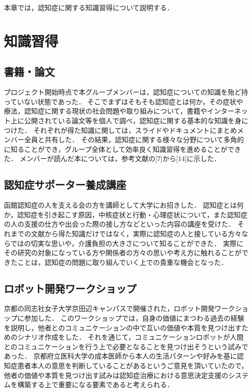 \documentclass[../report]{subfiles}
\begin{document}
本章では，認知症に関する知識習得について説明する．


\section{知識習得}
\subsection{書籍・論文}
プロジェクト開始時点で本グループメンバーは，認知症についての知識を殆ど持っていない状態であった．
そこでまずはそもそも認知症とは何か，その症状や療法，認知症に関する現状の社会問題や取り組みについて，書籍やインターネット上に公開されている論文等を個人で調べ，認知症に関する基本的な知識を身につけた．
それぞれが得た知識に関しては，スライドやドキュメントにまとめメンバー全員と共有した．
その結果，認知症に関する様々な分野について多角的に知ることができ，グループ全体として効率良く知識習得を進めることができた．
メンバーが読んだ本については，参考文献の[7]から[14]に示した．

\subsection{認知症サポーター養成講座}
函館認知症の人を支える会の方を講師として大学にお招きした．
認知症とは何か，認知症を引き起こす原因，中核症状と行動・心理症状について，また認知症の人の支援の仕方や出会った際の接し方などといった内容の講座を受けた．
それまでの文献から得た知識だけではなく，実際に認知症の人と接している方々ならではの切実な思いや，介護負担の大きさについて知ることができた．
実際にその研究の対象になっている方や関係者の方々の思いや考え方に触れることができたことは，認知症の問題に取り組んでいく上での貴重な機会となった．

\subsection{ロボット開発ワークショップ}
京都の同志社女子大学京田辺キャンパスで開催された，ロボット開発ワークショップに参加した．
このワークショップでは，自身の価値にまつわる過去の経験を説明し，他者とのコミュニケーションの中で互いの価値や本質を見つけ出すためのシナリオ作成をした．
それを通じて，コミュニケーションロボットが人間とのコミュニケーションを行う上で必要となることを見つけ出そうという試みであった．
京都府立医科大学の成本医師から本人の生活パターンや好みを基に認知症患者本人の意思を判断していることがあるというご意見を頂いていたので，他者の価値や本質を見つけ出す試みは認知症治療における意思決定支援のシステムを構築する上で重要になる要素であると考えられる．
\end{document}
